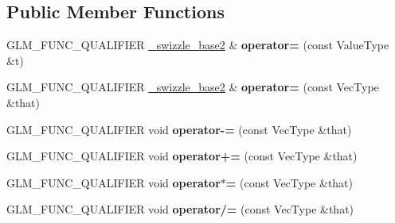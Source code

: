 \subsection*{Public Member Functions}
\begin{DoxyCompactItemize}
\item 
G\+L\+M\+\_\+\+F\+U\+N\+C\+\_\+\+Q\+U\+A\+L\+I\+F\+I\+ER \hyperlink{structglm_1_1detail_1_1__swizzle__base2}{\+\_\+swizzle\+\_\+base2} \& {\bfseries operator=} (const Value\+Type \&t)\hypertarget{structglm_1_1detail_1_1__swizzle__base2_a70442376cb261474e23090737deff976}{}\label{structglm_1_1detail_1_1__swizzle__base2_a70442376cb261474e23090737deff976}

\item 
G\+L\+M\+\_\+\+F\+U\+N\+C\+\_\+\+Q\+U\+A\+L\+I\+F\+I\+ER \hyperlink{structglm_1_1detail_1_1__swizzle__base2}{\+\_\+swizzle\+\_\+base2} \& {\bfseries operator=} (const Vec\+Type \&that)\hypertarget{structglm_1_1detail_1_1__swizzle__base2_a7b982a5056d94cd43393bf820ea627d0}{}\label{structglm_1_1detail_1_1__swizzle__base2_a7b982a5056d94cd43393bf820ea627d0}

\item 
G\+L\+M\+\_\+\+F\+U\+N\+C\+\_\+\+Q\+U\+A\+L\+I\+F\+I\+ER void {\bfseries operator-\/=} (const Vec\+Type \&that)\hypertarget{structglm_1_1detail_1_1__swizzle__base2_ab583f399dc6685deee97bdd5126f433a}{}\label{structglm_1_1detail_1_1__swizzle__base2_ab583f399dc6685deee97bdd5126f433a}

\item 
G\+L\+M\+\_\+\+F\+U\+N\+C\+\_\+\+Q\+U\+A\+L\+I\+F\+I\+ER void {\bfseries operator+=} (const Vec\+Type \&that)\hypertarget{structglm_1_1detail_1_1__swizzle__base2_a5e734b2e9da294d92bb347a3c7f44ded}{}\label{structglm_1_1detail_1_1__swizzle__base2_a5e734b2e9da294d92bb347a3c7f44ded}

\item 
G\+L\+M\+\_\+\+F\+U\+N\+C\+\_\+\+Q\+U\+A\+L\+I\+F\+I\+ER void {\bfseries operator$\ast$=} (const Vec\+Type \&that)\hypertarget{structglm_1_1detail_1_1__swizzle__base2_a6c686d110b936939c7ed67d7a6165778}{}\label{structglm_1_1detail_1_1__swizzle__base2_a6c686d110b936939c7ed67d7a6165778}

\item 
G\+L\+M\+\_\+\+F\+U\+N\+C\+\_\+\+Q\+U\+A\+L\+I\+F\+I\+ER void {\bfseries operator/=} (const Vec\+Type \&that)\hypertarget{structglm_1_1detail_1_1__swizzle__base2_a0a3e5ef1cb68f78a7e1bcd72f6e2dc4c}{}\label{structglm_1_1detail_1_1__swizzle__base2_a0a3e5ef1cb68f78a7e1bcd72f6e2dc4c}


\end{DoxyCompactItemize}
